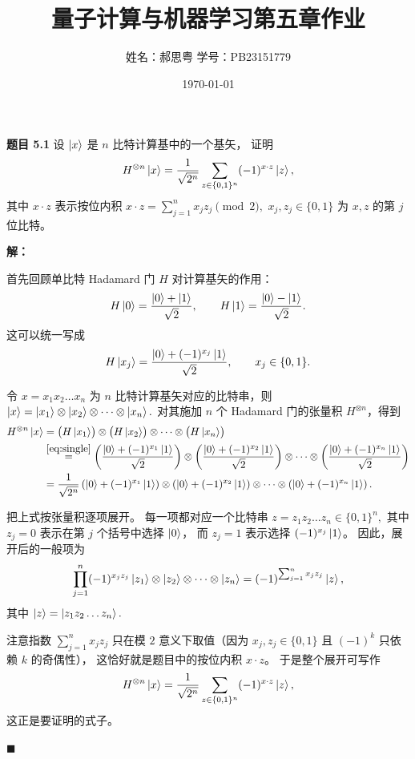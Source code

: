 \documentclass[12pt]{article}
\title{\textbf{量子计算与机器学习第五章作业}}
\author{姓名：郝思粤 \quad 学号：PB23151779}
\date{\today}
\begin{document}
\maketitle

\textbf{题目 5.1} 设 $\ket{x}$ 是 $n$ 比特计算基中的一个基矢，
证明
\begin{equation}
H^{\otimes n}\ket{x}
= \frac{1}{\sqrt{2^n}}
\sum_{z\in\{0,1\}^n} (-1)^{x\cdot z} \ket{z},
\end{equation}
其中 $x\cdot z$ 表示按位内积
\(
x\cdot z = \sum_{j=1}^{n} x_j z_j \pmod 2,
\)
$x_j,z_j\in\{0,1\}$ 为 $x,z$ 的第 $j$ 位比特。

\bigskip

\textbf{解：}

首先回顾单比特 Hadamard 门 $H$ 对计算基矢的作用：
\begin{equation}
H\ket{0} = \frac{\ket{0}+\ket{1}}{\sqrt{2}},\qquad
H\ket{1} = \frac{\ket{0}-\ket{1}}{\sqrt{2}}.
\end{equation}
这可以统一写成
\begin{equation}\label{eq:single}
H\ket{x_j} = \frac{\ket{0} + (-1)^{x_j}\ket{1}}{\sqrt{2}},
\qquad x_j\in\{0,1\}.
\end{equation}

令
\(
x = x_1 x_2 \dots x_n
\)
为 $n$ 比特计算基矢对应的比特串，则
\(
\ket{x} = \ket{x_1}\otimes\ket{x_2}\otimes\cdots\otimes\ket{x_n}.
\)
对其施加 $n$ 个 Hadamard 门的张量积 $H^{\otimes n}$，得到
\begin{align}
H^{\otimes n}\ket{x}
&= \bigl(H\ket{x_1}\bigr)\otimes\bigl(H\ket{x_2}\bigr)\otimes\cdots\otimes\bigl(H\ket{x_n}\bigr)\\
&\overset{\eqref{eq:single}}{=}
\left(\frac{\ket{0}+(-1)^{x_1}\ket{1}}{\sqrt{2}}\right)
\otimes
\left(\frac{\ket{0}+(-1)^{x_2}\ket{1}}{\sqrt{2}}\right)
\otimes \cdots \otimes
\left(\frac{\ket{0}+(-1)^{x_n}\ket{1}}{\sqrt{2}}\right)\\
&=
\frac{1}{\sqrt{2^n}}
\left(\ket{0}+(-1)^{x_1}\ket{1}\right)
\otimes
\left(\ket{0}+(-1)^{x_2}\ket{1}\right)
\otimes\cdots\otimes
\left(\ket{0}+(-1)^{x_n}\ket{1}\right).
\end{align}

把上式按张量积逐项展开。  
每一项都对应一个比特串
\(
z=z_1 z_2\dots z_n\in\{0,1\}^n,
\)
其中
\(
z_j=0
\)
表示在第 $j$ 个括号中选择 $\ket{0}$，
而
\(
z_j=1
\)
表示选择 $(-1)^{x_j}\ket{1}$。  
因此，展开后的一般项为
\begin{equation}
\prod_{j=1}^{n}(-1)^{x_j z_j} \ket{z_1}\otimes\ket{z_2}\otimes\cdots\otimes\ket{z_n}
= (-1)^{\sum_{j=1}^{n} x_j z_j}\ket{z},
\end{equation}
其中
\(
\ket{z}=\ket{z_1 z_2\dots z_n}.
\)

注意指数
\(
\sum_{j=1}^{n} x_j z_j
\)
只在模 $2$ 意义下取值（因为 $x_j,z_j\in\{0,1\}$ 且 $(-1)^k$ 只依赖 $k$ 的奇偶性），
这恰好就是题目中的按位内积 $x\cdot z$。  
于是整个展开可写作
\begin{equation}
H^{\otimes n}\ket{x}
=
\frac{1}{\sqrt{2^n}}
\sum_{z\in\{0,1\}^n}
(-1)^{x\cdot z} \ket{z},
\end{equation}
这正是要证明的式子。

\hfill$\blacksquare$
\end{document}
